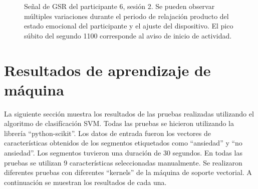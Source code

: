 \begin{figure}[h!]
        \centering
        \caption{Se\~nal de GSR del participante 6, sesi\'on 2. Se pueden observar m\'ultiples variaciones durante el periodo de relajaci\'on producto del estado emocional del participante y el ajuste del dispositivo. El pico s\'ubito del segundo 1100 corresponde al aviso de inicio de actividad.}\label{fig:longrelax}
\end{figure}


\section{Resultados de aprendizaje de m\'aquina}
La siguiente secci\'on muestra los resultados de las pruebas realizadas utilizando el algoritmo de clasif\'icaci\'on SVM. Todas las pruebas se hicieron utilizando la librer\'ia ``python-scikit''. Los datos de entrada fueron los vectores de caracter\'isticas obtenidos de los segmentos etiquetados como ``ansiedad'' y ``no ansiedad''. Los segmentos tuvieron una duraci\'on de 30 segundos. En todas las pruebas se utilizan 9 caracter\'isticas seleccionadas manualmente. Se realizaron diferentes pruebas con diferentes ``kernels'' de la m\'aquina de soporte vectorial. A continuaci\'on se muestran los resultados de cada una.

